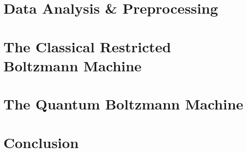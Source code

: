 \documentclass[11pt,twoside]{report}
\begin{document}
\chapter{Data Analysis \& Preprocessing}
\label{ch:data_analysis}

\newpage\thispagestyle{empty}\mbox{}\newpage

\chapter{The Classical Restricted Boltzmann Machine}
\label{ch:rbm}


\chapter{The Quantum Boltzmann Machine}
\label{ch:qbm}


\chapter{Conclusion}
\label{ch:conclusion}


\appendix
\begin{appendices}
\label{ch:appendix}

\end{appendices}

\printbibliography
\end{document}
